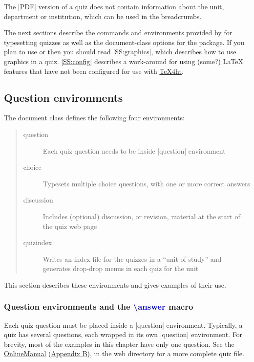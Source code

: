 \documentclass[svgnames]{article}
\newcommand\TeXfht{\href{https://www.ctan.org/tex4ht}{TeX4ht}\xspace}
\newcommand\OnlineManual{\href{http://www.maths.usyd.edu.au/u/mathas/WebQuiz/webquiz-online-manual.html}{OnlineManual} (\hyperref[S:online]{Appendix B})\xspace}
\begin{document}
    The \BashCode|PDF| version of a quiz does not contain information about
    the unit, department or institution, which can be used in the
    breadcrumbs.

    The next sections describe the commands and environments provided by
    \WebQuiz for typesetting quizzes as well as the document-class options
    for the package. If you plan to use  or
     then you should read \autoref{SS:graphics}, which
    describes how to use graphics in a \WebQuiz quiz.
    \autoref{SS:config} describes a work-around for using (some?) \LaTeX{}
    features that have not been configured for use with \TeXfht.

  \subsection{Question environments}

  The \WebQuiz document class defines the following four environments:
  \begin{quote}
    \begin{description}
      \item[question] Each quiz question needs to be inside
      \LatexCode|question| environment
      \item[choice] Typesets multiple choice questions, with
      one or more correct answers
      \item[discussion] Includes (optional) discussion, or revision,
      material at the start of the quiz web page
      \item[quizindex] Writes an index file for the quizzes in
      a ``unit of study'' and generates drop-drop menus in each quiz for
      the unit
    \end{description}
  \end{quote}
  This section describes these environments and gives examples
  of their use.

  \subsubsection{Question environments and the
         \textcolor{blue}{\textbackslash answer} macro}

  Each quiz question must be placed inside a \LatexCode|question|
  environment. Typically, a quiz has several questions, each wrapped in
  its own \LatexCode|question| environment.  For brevity, most of the
  examples in this chapter have only one question. See the
  \OnlineManual, in the \WebQuiz web directory for a more complete quiz
  file.
\end{document}
